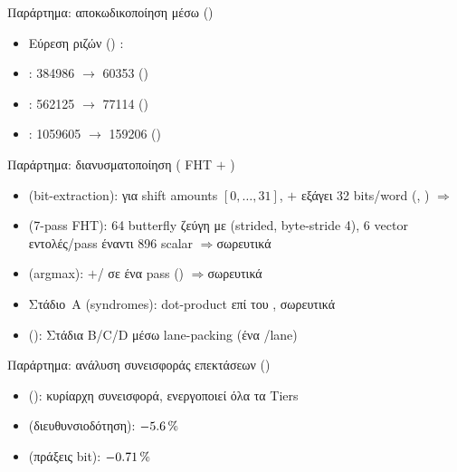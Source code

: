 \begin{frame}{Παράρτημα: αποκωδικοποίηση μέσω  (\Zvbc)}
  \begin{itemize}
    \item Εύρεση ριζών () :  \instret
    \item {}: \num{384986} $\rightarrow$ \num{60353} \instret ()
    \item {}: \num{562125} $\rightarrow$ \num{77114} \instret ()
    \item {}: \num{1059605} $\rightarrow$ \num{159206} \instret ()
  \end{itemize}
\end{frame}

\begin{frame}{Παράρτημα: διανυσματοποίηση  ( FHT $+$ )}
  \begin{itemize}\small
    \item {} (bit-extraction):  για shift amounts $[0,\ldots,31]$, $+$ εξάγει \num{32} bits/word (, ) \enspace$\Rightarrow$\enspace {}
    \item {} (7-pass FHT): \num{64} butterfly ζεύγη με  (strided, byte-stride \num{4}), \num{6} vector εντολές/pass έναντι \num{896} scalar \enspace$\Rightarrow$\enspace σωρευτικά 
    \item {} (argmax): $+$/ σε ένα pass () \enspace$\Rightarrow$\enspace σωρευτικά 
    \item {} Στάδιο~A (syndromes): dot-product επί του , σωρευτικά 
    \item {} (\Zvbc): Στάδια B/C/D μέσω  lane-packing (ένα /lane)
  \end{itemize}
\end{frame}

\begin{frame}{Παράρτημα: ανάλυση συνεισφοράς επεκτάσεων ()}
  \begin{itemize}
    \item \Zbc (\clmul): κυρίαρχη συνεισφορά, ενεργοποιεί όλα τα Tiers
    \item {} (διευθυνσιοδότηση): $-\SI{5.6}{\percent}$ \instret
    \item {} (πράξεις bit): $-\SI{0.71}{\percent}$ \instret
  \end{itemize}
\end{frame}

